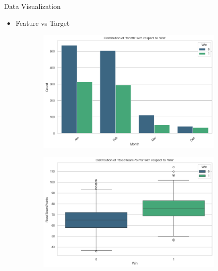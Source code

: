 \documentclass{beamer}
\begin{document}
\begin{frame}{Data Visualization}
    \begin{itemize}
        \item Feature vs Target
    \end{itemize}
    \begin{figure}
        \centering
        \begin{subfigure}[b]{0.4\linewidth}
            \includegraphics[width=\linewidth]{images/month_win.png}
        \end{subfigure}
        \begin{subfigure}[b]{0.4\linewidth}
            \includegraphics[width=\linewidth]{images/points_win.png}
        \end{subfigure}
        \begin{subfigure}[b]{0.4\linewidth}

\end{subfigure}
\end{figure}
\end{frame}
\end{document}
